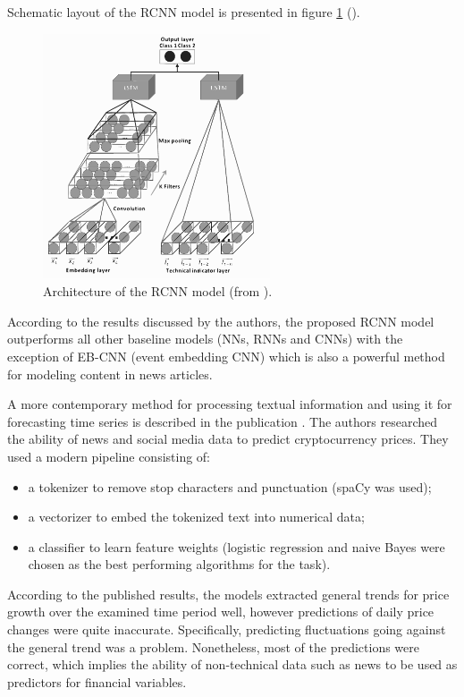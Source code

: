 \documentclass[13pt, a4paper]{article}
\begin{document}
Schematic layout of the RCNN model is presented in figure \ref{fig:gr5} (\cite{vargas2017deep}). 
\begin{figure}[h!]\vspace*{4pt}
	\centerline{\includegraphics[width=0.6\textwidth]{./visuals/gr5.pdf}}
	\caption{Architecture of the RCNN model (from \cite{vargas2017deep}).}
\label{fig:gr5}
\end{figure}

According to the results discussed by the authors, the proposed RCNN model outperforms all other baseline models (NNs, RNNs and CNNs) with the exception of EB-CNN (event embedding CNN) which is also a powerful method for modeling content in news articles.

A more contemporary method for processing textual information and using it for forecasting time series is described in the publication \cite{lamon2017cryptocurrency}. The authors researched the ability of news and social media data to predict cryptocurrency prices. They used a modern pipeline consisting of:
\begin{itemize}
	\item a tokenizer to remove stop characters and punctuation (spaCy was used);
	\item a vectorizer to embed the tokenized text into numerical data;
	\item a classifier to learn feature weights (logistic regression and naive Bayes were chosen as the best performing algorithms for the task).
\end{itemize}
According to the published results, the models extracted general trends for price growth over the examined time period well, however predictions of daily price changes were quite inaccurate. Specifically, predicting fluctuations going against the general trend was a problem. Nonetheless, most of the predictions were correct, which implies the ability of non-technical data such as news to be used as predictors for financial variables.
\end{document}
